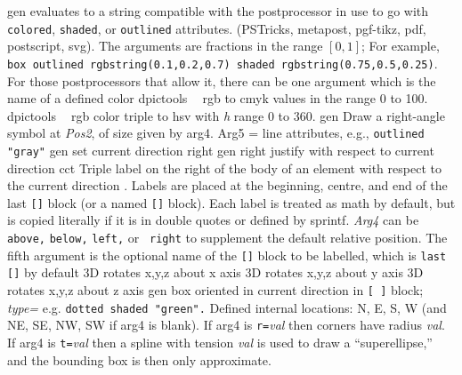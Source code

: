 %
  {gen}%
  {evaluates to a string compatible with the postprocessor in use
   to go with {\tt colored}, {\tt shaded}, or {\tt outlined} attributes.
   (PSTricks, metapost, pgf-tikz, pdf, postscript, svg).  The arguments
   are fractions in the range $[0,1]$; For example, {\tt box outlined
   rgbstring(0.1,0.2,0.7) shaded rgbstring(0.75,0.5,0.25)}.  For those
   postprocessors that allow it, there can be one argument which is the
   name of a defined color}%
%
  {dpictools}%
  {$\;\;$ rgb to cmyk values in the range 0 to 100.}%
%
  {dpictools}%
  {$\;\;$ rgb color triple to hsv with {\sl h} range 0 to 360.}%
 {gen}%
  {Draw a right-angle symbol at {\sl Pos2}, of size
  given by arg4. Arg5 =
   line attributes, e.g., {\tt outlined "gray"}}%
%
  {gen}%
  {set current direction right }%
%
  {gen}%
  {right justify with respect to current direction}%
%
  {cct}%
  {Triple label on the right of the body of an element with respect to the
    current direction .  Labels are placed at the
    beginning, centre, and end of the last {\tt []} block (or a named
    {\tt []} block). Each label is treated as math by default, but is
    copied literally if it is in double quotes or defined by sprintf.
    {\sl Arg4} can be {\tt above,} {\tt below,} {\tt left,} or {\tt
    right} to supplement the default relative position.  The fifth
    argument is the optional name of the {\tt []} block to be labelled,
    which is {\tt last []} by default}%
%
  {3D} {rotates x,y,z about x axis}%
%
  {3D} {rotates x,y,z about y axis}%
%
  {3D} {rotates x,y,z about z axis}%
%
  {gen}%
  {box oriented in current direction in {\tt [ ]} block;
   {\sl type=} e.g. {\tt dotted shaded "green".}  Defined internal
   locations: N, E, S, W (and NE, SE, NW, SW if arg4 is blank).  If arg4
   is {\tt r=}{\sl val} then corners have radius {\sl val}.  If arg4 is
   {\tt t=}{\sl val} then a spline with tension {\sl val} is used to draw
   a ``superellipse,'' and the bounding box is then only approximate. }%
